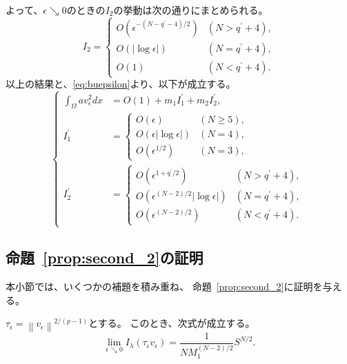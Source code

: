 よって、$\epsilon \searrow 0$のときの$I_2$の挙動は次の通りにまとめられる。
\[
 I_2 = \begin{cases}
        O(\epsilon^{-(N-q^\prime-4)/2}) & (N > q^\prime + 4),\\
        O(\lvert \log \epsilon \rvert) & (N = q^\prime + 4), \\ 
        O(1) & (N < q^\prime + 4).
       \end{cases}
\]
以上の結果と、\eqref{eq:buepsilon}より、以下が成立する。
\begin{equation}
 \left\{ 
 \begin{aligned}
  \int_\Omega a v_\epsilon^2 dx &= O(1) + m_1 I_1^\prime + m_2
  I_2^\prime, \\
  I_1^\prime &= \begin{cases}
                 O(\epsilon) & (N \geq 5), \\
                 O(\epsilon \lvert \log \epsilon \rvert) & (N = 4), \\
                 O(\epsilon^{1/2}) & (N = 3),
                \end{cases} \\
  I_2^\prime &= \begin{cases}
                 O(\epsilon^{1 + q^\prime/2 }) & (N > q^\prime + 4), \\
                 O(\epsilon^{(N-2)/2} \lvert \log \epsilon \rvert) & (N =
                 q^\prime + 4), \\
                 O(\epsilon^{(N-2)/2}) & (N < q^\prime + 4).
                \end{cases}
 \end{aligned} \right.
\end{equation}

\subsection{命題~\ref{prop:second_2}の証明}

本小節では、いくつかの補題を積み重ね、
命題~\ref{prop:second_2}に証明を与える。

\begin{lem}
 $\tau_\epsilon = \left\| v_\epsilon \right\|^{2/(p-1)}$とする。
 このとき、次式が成立する。
 \begin{equation}
  \lim_{\epsilon \searrow 0} I_\lambda (\tau_\epsilon v_\epsilon) = 
   \frac{1}{NM_1^{(N-2)/2}} S^{N/2}. \label{eq:limI}
 \end{equation}
\end{lem}

